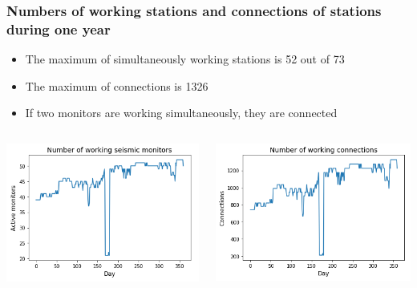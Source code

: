\documentclass{beamer}
\begin{document}
\begin{frame}
\frametitle{Numbers of working stations and connections of stations during one year}
\begin{itemize}
\item The maximum of simultaneously working stations is 52 out of 73
\item The maximum of connections is 1326
\item If two monitors are working simultaneously, they are connected
\end{itemize}

\begin{columns}
\includegraphics[width=\textwidth]{working_monitors-presentation.png}

\includegraphics[width=\textwidth]{working_connections_presentation.png}
\end{columns}
\end{frame}
\end{document}
